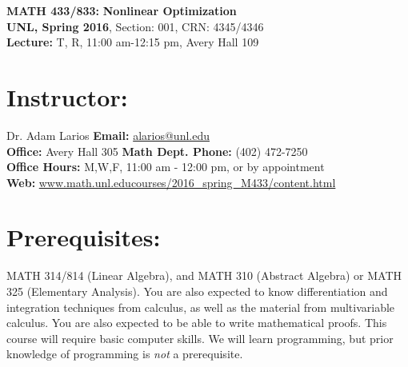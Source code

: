 \documentclass[margin]{res}
\theoremstyle{plain}
\theoremstyle{definition}
\theoremstyle{remark}
\begin{document}
\begin{center}
   \textbf{MATH 433/833:} 
   \textbf{Nonlinear Optimization}\\
   \textbf{UNL, Spring 2016}, Section: 001, CRN: 4345/4346
    \\
   \textbf{Lecture:} T, R, 11:00 am-12:15 pm, Avery Hall 109\\
\end{center}
%
\vspace{-0.2in}
%
\begin{resume}
\section{Instructor:} Dr. Adam Larios 
\hfill \textbf{Email:} 
\url{alarios@unl.edu}
\\
\textbf{Office:} Avery Hall 305
\hfill
\textbf{Math Dept. Phone:} (402) 472-7250
\\
\textbf{Office Hours:} M,W,F, 11:00 am - 12:00 pm, or by appointment
\hfill
\\
\textbf{Web:} \url{www.math.unl.educourses/2016_spring_M433/content.html}



 \section{Prerequisites:} MATH 314/814 (Linear Algebra), and MATH 310 (Abstract Algebra) or MATH 325 (Elementary Analysis).  You are also expected to know differentiation and integration techniques from calculus, as well as the material from multivariable calculus.   You are also expected to be able to write mathematical proofs.  This course will require basic computer skills.  We will learn programming, but prior knowledge of programming is \textit{not} a prerequisite.
 
 
 

\end{resume}
\end{document}
